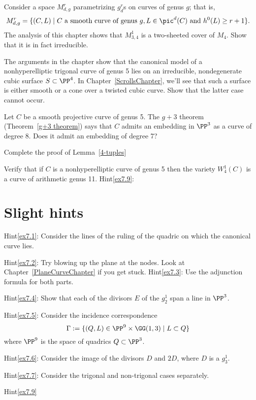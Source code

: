 \begin{exercise}\label{ex7.5}
Consider a space $M^r_{d,g}$ parametrizing $g^r_d$s on curves of genus $g$; that is,
$$
M^r_{d,g} = \{ (C, L) \mid C \text{ a smooth curve of genus } g, L \in \pic^d(C) \text{ and } h^0(L) \geq r+1 \}.
$$
The analysis of this chapter shows that $M^1_{3,4}$ is a two-sheeted cover of $M_4$. Show that it is in fact irreducible.
\end{exercise}

\begin{exercise}\label{ex7.6}
The arguments in the chapter show that the canonical model of a nonhyperelliptic trigonal curve of genus 5 lies on an irreducible, nondegenerate cubic surface $S \subset \PP^4$. In Chapter~\ref{ScrollsChapter}, we'll see that such a surface is either smooth or a cone over a twisted cubic curve. Show that the latter case cannot occur. 
\end{exercise}

\begin{exercise}\label{ex7.7}
Let $C$ be a smooth projective curve of genus 5. The $g+3$ theorem (Theorem~\ref{g+3 theorem}) says that $C$ admits an embedding in $\PP^3$ as a curve of degree 8. Does it admit an embedding of degree 7?
\end{exercise}

\begin{exercise}\label{non-red 4-tuples}\label{ex7.8}
Complete the proof of Lemma~\ref{4-tuples}
\end{exercise}

\begin{exercise}\label{ex7.9}
Verify that if $C$ is a nonhyperelliptic curve of genus 5 then the variety $W^1_4(C)$ is a curve of arithmetic genus 11.
Hint\ref{ex7.9}: \end{exercise}

\section{Slight hints}
Hint\ref{ex7.1}: Consider the lines of the ruling of the quadric on which the canonical curve lies.

Hint\ref{ex7.2}: Try blowing up the plane at the nodes. Look at Chapter~\ref{PlaneCurveChapter} if you get stuck.
Hint\ref{ex7.3}: Use the adjunction formula for both parts.

Hint\ref{ex7.4}: Show that each of the divisors $E$ of the $g^1_2$ span a line in $\PP^3$. 

Hint\ref{ex7.5}: Consider the incidence correspondence
$$
\Gamma := \{ (Q, L) \in \PP^9 \times \GG(1,3) \mid L \subset Q \}
$$
where $\PP^9$ is the space of quadrics $Q\subset \PP^3$.

Hint\ref{ex7.6}: Consider the image of the divisors $D$ and $2D$, where $D$ is a $g^1_3$.

Hint\ref{ex7.7}: Consider the trigonal and non-trigonal cases separately. 

Hint\ref{ex7.9} 



